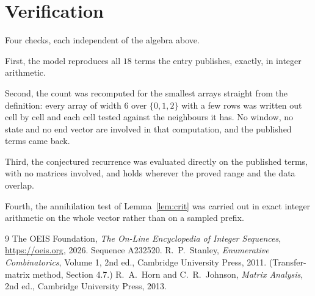 \documentclass[11pt,a4paper]{article}
\theoremstyle{plain}
\theoremstyle{definition}
\begin{document}
\section{Verification}

Four checks, each independent of the algebra above.

First, the model reproduces all $18$ terms the entry publishes, exactly, in integer
arithmetic.

Second, the count was recomputed for the smallest arrays straight from the definition: every
array of width $6$ over $\{0,1,2\}$ with a few rows was written out cell by cell and each cell
tested against the neighbours it has. No window, no state and no end vector are involved in that
computation, and the published terms came back.

Third, the conjectured recurrence was evaluated directly on the published terms, with no
matrices involved, and holds wherever the proved range and the data overlap.

Fourth, the annihilation test of Lemma~\ref{lem:crit} was carried out in exact integer
arithmetic on the whole vector rather than on a sampled prefix.

\begin{thebibliography}{9}
 The OEIS Foundation, \emph{The On-Line Encyclopedia of Integer
Sequences}, \url{https://oeis.org}, 2026. Sequence A232520.
 R.~P.~Stanley, \emph{Enumerative Combinatorics}, Volume 1, 2nd ed.,
Cambridge University Press, 2011. (Transfer-matrix method, Section 4.7.)
 R.~A.~Horn and C.~R.~Johnson, \emph{Matrix Analysis}, 2nd ed., Cambridge
University Press, 2013.
\end{thebibliography}
\end{document}
